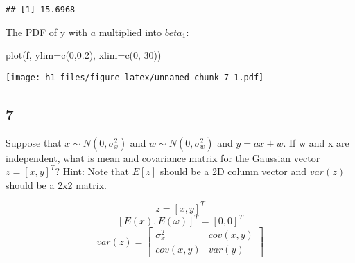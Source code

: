 \documentclass[
]{article}
\newenvironment{Shaded}{\begin{snugshade}}{\end{snugshade}}
\newcommand{\AttributeTok}[1]{\textcolor[rgb]{0.77,0.63,0.00}{#1}}
\newcommand{\DecValTok}[1]{\textcolor[rgb]{0.00,0.00,0.81}{#1}}
\newcommand{\FloatTok}[1]{\textcolor[rgb]{0.00,0.00,0.81}{#1}}
\newcommand{\FunctionTok}[1]{\textcolor[rgb]{0.00,0.00,0.00}{#1}}
\newcommand{\NormalTok}[1]{#1}
\begin{document}
\begin{verbatim}
## [1] 15.6968
\end{verbatim}

The PDF of y with \(a\) multiplied into \(beta_1\):

\begin{Shaded}
\begin{Highlighting}[]
\FunctionTok{plot}\NormalTok{(f, }\AttributeTok{ylim=}\FunctionTok{c}\NormalTok{(}\DecValTok{0}\NormalTok{,}\FloatTok{0.2}\NormalTok{), }\AttributeTok{xlim=}\FunctionTok{c}\NormalTok{(}\DecValTok{0}\NormalTok{, }\DecValTok{30}\NormalTok{))}
\end{Highlighting}
\end{Shaded}

\texttt{[image: h1\_files/figure-latex/unnamed-chunk-7-1.pdf]}

\hypertarget{section-6}{%
\subsection{7}\label{section-6}}

Suppose that \(x\sim N(0,\sigma_x^2)\) and \(w\sim N(0,\sigma_w^2)\) and
\(y=ax+w\). If w and x are independent, what is mean and covariance
matrix for the Gaussian vector \(z=[x,y]^T\)? Hint: Note that \(E[z]\)
should be a 2D column vector and \(var(z)\) should be a 2x2 matrix.

\[z=[x,y]^T\] \[[E(x), E(\omega)]^T  = [0, 0]^T\]
\[var(z)= \begin{bmatrix}\sigma_x^2&cov(x,y)\\cov(x,y)&var(y)\end{bmatrix}\]
\end{document}

